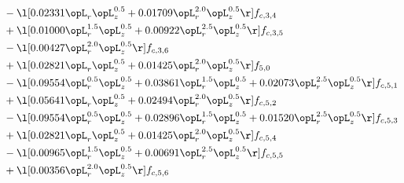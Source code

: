 \begin{alignat}{2}
& - \l[  0.02331 \opL_r \opL_z^{0.5} +  0.01709 \opL_r^{2.0} \opL_z^{0.5}  \r] f_{c,3,4} \nonumber \\ 
& + \l[  0.01000 \opL_r^{1.5} \opL_z^{0.5} +  0.00922 \opL_r^{2.5} \opL_z^{0.5}  \r] f_{c,3,5} \nonumber \\ 
& - \l[  0.00427 \opL_r^{2.0} \opL_z^{0.5}  \r] f_{c,3,6} \nonumber \\ 
& + \l[  0.02821 \opL_r \opL_z^{0.5} +  0.01425 \opL_r^{2.0} \opL_z^{0.5}  \r] f_{5,0} \nonumber \\ 
& - \l[  0.09554 \opL_r^{0.5} \opL_z^{0.5} +  0.03861 \opL_r^{1.5} \opL_z^{0.5} +  0.02073 \opL_r^{2.5} \opL_z^{0.5}  \r] f_{c,5,1} \nonumber \\ 
& + \l[  0.05641 \opL_r \opL_z^{0.5} +  0.02494 \opL_r^{2.0} \opL_z^{0.5}  \r] f_{c,5,2} \nonumber \\ 
& - \l[  0.09554 \opL_r^{0.5} \opL_z^{0.5} +  0.02896 \opL_r^{1.5} \opL_z^{0.5} +  0.01520 \opL_r^{2.5} \opL_z^{0.5}  \r] f_{c,5,3} \nonumber \\ 
& + \l[  0.02821 \opL_r \opL_z^{0.5} +  0.01425 \opL_r^{2.0} \opL_z^{0.5}  \r] f_{c,5,4} \nonumber \\ 
& - \l[  0.00965 \opL_r^{1.5} \opL_z^{0.5} +  0.00691 \opL_r^{2.5} \opL_z^{0.5}  \r] f_{c,5,5} \nonumber \\ 
& + \l[  0.00356 \opL_r^{2.0} \opL_z^{0.5}  \r] f_{c,5,6} \nonumber \\ 
\end{alignat} 


